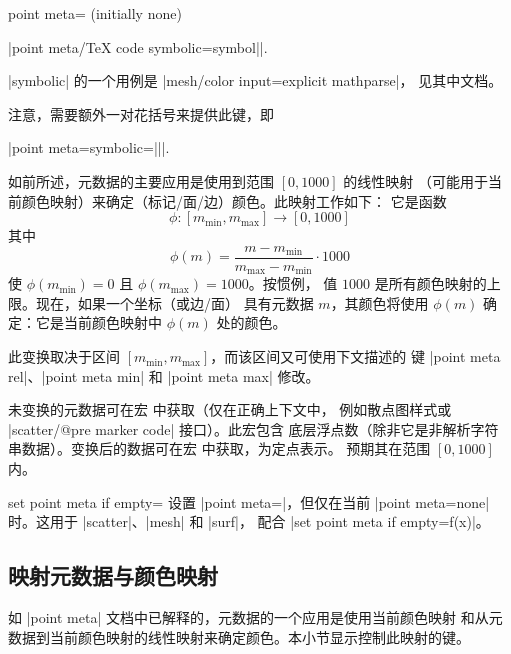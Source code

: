 \begin{pgfplotskey}{point meta= (initially none)%
}
\begin{description}
            |point meta/TeX code symbolic={\def\pgfplotspointmeta|\marg{symbol}|}|.

            |symbolic| 的一个用例是 |mesh/color input=explicit mathparse|，
            见其中文档。

            注意，需要额外一对花括号来提供此键，即

            |point meta={symbolic=||}|.
    \end{description}

    如前所述，元数据的主要应用是使用到范围 $[0,1000]$ 的线性映射
    （可能用于当前颜色映射）来确定（标记/面/边）颜色。此映射工作如下：
    它是函数
        \[ \phi\colon [m_{\min},m_{\max}] \to [0,1000] \]
    其中
        \[ \phi(m) = \frac{m - m_{\min}}{m_{\max} - m_{\min}} \cdot 1000 \]
    使 $\phi(m_{\min})=0$ 且 $\phi(m_{\max})=1000$。按惯例，
    值 $1000$ 是所有颜色映射的上限。现在，如果一个坐标（或边/面）
    具有元数据 $m$，其颜色将使用 $\phi(m)$ 确定：它是当前颜色映射中
    $\phi(m)$\textperthousand{} 处的颜色。

    此变换取决于区间 $[m_{\min},m_{\max}]$，而该区间又可使用下文描述的
    键 |point meta rel|、|point meta min| 和 |point meta max| 修改。

    未变换的元数据可在宏
    \declareandlabel{\pgfplotspointmeta} 中获取（仅在正确上下文中，
    例如散点图样式或 |scatter/@pre marker code| 接口）。此宏包含
    底层浮点数（除非它是非解析字符串数据）。变换后的数据可在宏
    \declareandlabel{\pgfplotspointmetatransformed} 中获取，为定点表示。
    预期其在范围 $[0,1000]$ 内。

\end{pgfplotskey}

\begin{pgfplotskey}{set point meta if empty=}
    设置 |point meta=|，但仅在当前
    |point meta=none| 时。这用于 |scatter|、|mesh| 和 |surf|，
    配合 |set point meta if empty=f(x)|。
\end{pgfplotskey}


\subsection{映射元数据与颜色映射}

如 |point meta| 文档中已解释的，元数据的一个应用是使用当前颜色映射
和从元数据到当前颜色映射的线性映射来确定颜色。本小节显示控制此映射的键。

